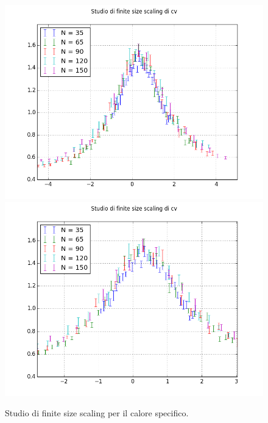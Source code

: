\begin{center}
	\begin{figure}
		\centering

		\includegraphics[scale=0.55]{potts/cvfss.png}
				\includegraphics[scale=0.55]{potts/cvfsszoom.png}
		\caption{Studio di finite size scaling per il calore specifico.}	
	\end{figure}
\end{center}






